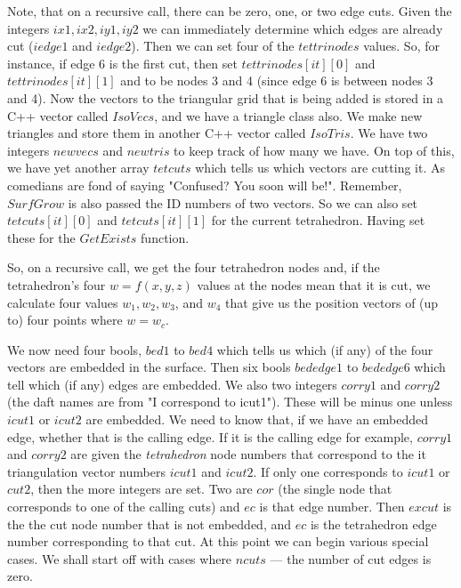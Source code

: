 \documentclass[12pt]{article}
\begin{document}
Note, that on a recursive call, there can be zero, one, or two edge cuts.
Given the integers $ix1,ix2,iy1,iy2$ we can immediately determine which 
 edges are already cut ($iedge1$ and $iedge2$). Then we can set four
of the  $tettrinodes$ values. So, for instance, if edge 6 is the first
cut, then set $tettrinodes[it][0]$ and $tettrinodes[it][1]$ and to be 
nodes 3 and 4 (since edge 6 is between nodes 3 and 4).  
Now the vectors to the triangular grid that is being added is stored
in a C++ vector called $IsoVecs$, and we have a triangle class also.
We make new triangles and store them in another C++ vector called $IsoTris$.
We have two integers $newvecs$ and $newtris$ to keep track of how many we have.
On top of this, we have yet another array $tetcuts$ which tells us which
vectors are cutting it. As comedians are fond of saying "Confused? You soon will be!". Remember, $SurfGrow$ is also passed the ID numbers of two vectors.
So we can also set $tetcuts[it][0]$ and $tetcuts[it][1]$  for the current 
tetrahedron. Having set these for the $GetExists$ function.

So, on a recursive call, we get the four tetrahedron nodes and, if
the tetrahedron's four $w=f(x,y,z)$ values at the nodes mean that it is
cut, we calculate four values $w_1, w_2, w_3$, and $w_4$ that give us
the position vectors of (up to) four points where $w=w_c$. 

We now need four bools, $bed1$ to $bed4$ which tells us which (if any)
 of the four vectors are embedded in the surface. Then six bools
 $bededge1$ to $bededge6$ which tell which (if any) edges are embedded.
We also two integers $corry1$ and $corry2$ (the daft names are from 
"I correspond to icut1"). These will be minus
one unless $icut1$ or $icut2$ are embedded. We need to know that, if
we have an embedded edge, whether that is the calling edge. If
it is the calling edge for example, $corry1$ and $corry2$ are given
the {\it tetrahedron} node numbers that correspond
to the {it triangulation} vector numbers $icut1$ and $icut2$. 
If only one corresponds to $icut1$ or
 $cut2$, then the more integers are set. Two are $cor$ (the single node
that corresponds to one of the calling cuts) and $ec$ is that edge number.
Then $excut$ is the the cut node number that is not embedded, and $ec$ is
the tetrahedron edge number corresponding to that cut. At this point
we can begin various special cases. We shall start off with cases where 
$ncuts$ --- the number of cut edges is zero.
\end{document}
